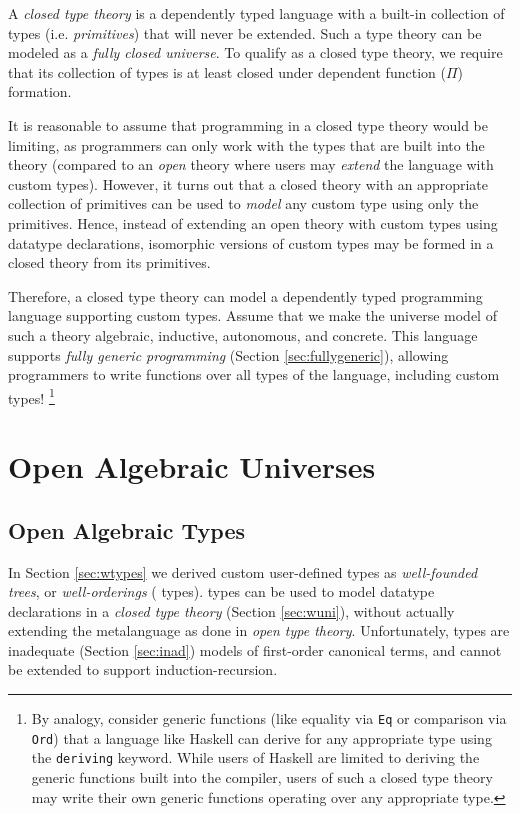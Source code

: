 \documentclass[12pt]{report}
\newcommand{\refsec}[1]{Section \ref{sec:#1}}
\newcommand{\AgdaData}[1]{\AgdaDatatype{#1}}
\theoremstyle{definition}
\theoremstyle{remark}
\numberwithin{definition}{section}
\numberwithin{equation}{section}
\numberwithin{proposition}{section}
\numberwithin{conjecture}{section}
\numberwithin{theorem}{section}
\numberwithin{lemma}{section}
\numberwithin{corollary}{section}
\numberwithin{example}{section}
\numberwithin{remark}{section}
\begin{document}
A \textit{closed type theory} is a dependently typed language with a
built-in collection of types
(i.e. \textit{primitives}) that will never be extended.
Such a type
theory can be modeled as a \textit{fully closed universe}. To qualify
as a closed type theory, we require that its collection of types is at
least closed under dependent function ($\Pi$) formation.

It is reasonable to assume that programming in a closed type theory
would be limiting, as programmers can only work with the types that
are built into the theory (compared to an \textit{open} theory where
users may \textit{extend} the language with custom types).
However, it turns out that a closed theory with an appropriate
collection of primitives can be used to \textit{model} any custom type
using only the primitives. Hence, instead of extending an open theory
with custom types using datatype declarations,
isomorphic versions of custom types
may be formed in a closed theory from its primitives.

Therefore, a closed type theory can model a dependently typed
programming language supporting custom types. Assume that we make
the universe model of such a theory algebraic, inductive, autonomous,
and concrete. This language supports
\textit{fully generic programming} (\refsec{fullygeneric}), allowing
programmers to write functions over all types of the
language, including custom types!
\footnote{By analogy, consider generic functions
  (like equality via \texttt{Eq} or comparison via \texttt{Ord})
  that a language like
  Haskell can derive for any appropriate type using the
  \texttt{deriving} keyword. While users of Haskell are limited to
  deriving the generic functions built into the compiler, users of
  such a closed type theory may write their own generic functions
  operating over any appropriate type.
}



\part{Open Algebraic Universes}\label{part:open}

\chapter{Open Algebraic Types}\label{ch:open}

In \refsec{wtypes} we derived custom user-defined types as
\textit{well-founded trees}, or
\textit{well-orderings} (\AgdaData{W} types). \AgdaData{W} types
can be used to model
datatype declarations
in a \textit{closed type theory} (\refsec{wuni}),
without actually extending the metalanguage as done in
\textit{open type theory}. Unfortunately, \AgdaData{W} types are
inadequate (\refsec{inad}) models of first-order canonical terms, and
cannot be extended to support induction-recursion.
\end{document}
